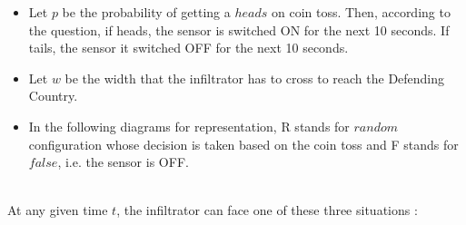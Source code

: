\documentclass[12pt]{article}
\begin{document}
\begin{itemize}
    \item Let $p$ be the probability of getting a $heads$ on coin toss. Then, according to the question, if heads, the sensor is switched ON for the next 10 seconds. If tails, the sensor it switched OFF for the next 10 seconds.
    
    \item Let $w$ be the width that the infiltrator has to cross to reach the Defending Country.
    
    \item In the following diagrams for representation, R stands for $random$ configuration whose decision is taken based on the coin toss and F stands for $false$, i.e. the sensor is OFF.
    
\end{itemize} 
\\
At any given time $t$, the infiltrator can face one of these three situations : 
\end{document}
